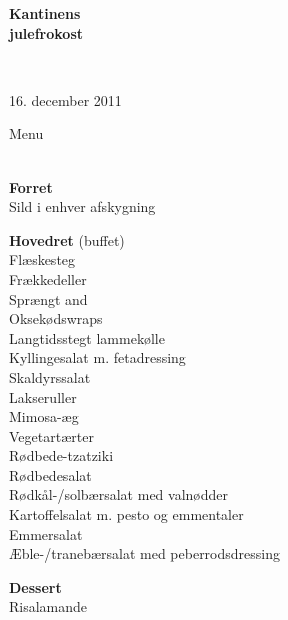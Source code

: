 \begin{center}
\begin{HUGE}
\textbf{Kantinens \\[3mm] julefrokost}
\end{HUGE}
\\[.6cm]
\begin{Large}
16. december 2011
\end{Large}
\end{center}
\vspace*{.4cm}
\begin{flushleft}
\begin{huge}
Menu
\end{huge}
\\[.1cm]
\newcommand{\course}[1]{\vspace*{4mm} \textbf{#1} \vspace{1mm}}
\course{Forret}
\\ Sild i enhver afskygning

\course{Hovedret} (buffet)
\\ Flæskesteg
\\ Frækkedeller
\\ Sprængt and
\\ Oksekødswraps
\\ Langtidsstegt lammekølle
\\ Kyllingesalat m. fetadressing
\\[2mm] Skaldyrssalat
\\ Lakseruller
\\ Mimosa-æg 
\\[2mm] Vegetartærter
\\ Rødbede-tzatziki
\\ Rødbedesalat
\\ Rødkål-/solbærsalat med valnødder
\\ Kartoffelsalat m. pesto og emmentaler
\\ Emmersalat
\\ Æble-/tranebærsalat med peberrodsdressing

\course{Dessert}
\\ Risalamande
\end{flushleft}

